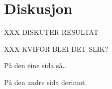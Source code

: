 \section{Diskusjon}
XXX DISKUTER RESULTAT

XXX KVIFOR BLEI DET SLIK?



På den eine sida så..

På den andre sida derimot.
